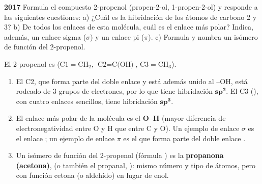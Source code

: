 \begin{exerciseEVAU}
    \textbf{ 2017 } Formula el compuesto 2-propenol (propen-2-ol, 1-propen-2-ol) y responde a las siguientes cuestiones: a) ¿Cuál es la hibridación de los átomos de carbono 2 y 3? b) De todos los enlaces de esta molécula, cuál es el enlace más polar? Indica, además, un enlace sigma (\(\sigma\)) y un enlace pi (\(\pi\)). c) Formula y nombra un isómero de función del 2-propenol.

    \begin{solu}


        El 2-propenol es  (\(\text{C1}{=}\text{CH}_2\), \(\text{C2}{=}\text{C(OH)}\), \(\text{C3}{=}\text{CH}_3\)).

        \begin{enumerate}[label=\letraminuscula]
            \item El C2, que forma parte del doble enlace  y está además unido al --OH, está rodeado de 3 grupos de electrones, por lo que tiene hibridación \(\bm{sp^2}\). El C3 (), con cuatro enlaces sencillos, tiene hibridación \(\bm{sp^3}\).

            \item El enlace más polar de la molécula es el \textbf{O--H} (mayor diferencia de electronegatividad entre O y H que entre C y O). Un ejemplo de enlace \(\sigma\) es el enlace ; un ejemplo de enlace \(\pi\) es el que forma parte del doble enlace .

            \item Un isómero de función del 2-propenol (fórmula ) es la \textbf{propanona (acetona)},  (o también el propanal, ): mismo número y tipo de átomos, pero con función cetona (o aldehído) en lugar de enol.
        \end{enumerate}
    \end{solu}
\end{exerciseEVAU}

